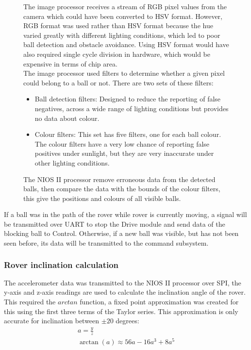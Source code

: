 \documentclass[11pt, a4paper]{article}
\begin{document}
\begin{figure}[ht]
\begin{minipage}[t]{0.5\linewidth}
        The image processor receives a stream of RGB pixel values from the camera which could have been converted to HSV format. However, RGB format was used rather than HSV format because the hue varied greatly with different lighting conditions, which led to poor ball detection and obstacle avoidance. Using HSV format would have also required single cycle division in hardware, which would be expensive in terms of chip area.
        \\
        The image processor used filters to determine whether a given pixel could belong to a ball or not. There are two sets of these filters:
        \begin{itemize}
            \item Ball detection filters: Designed to reduce the reporting of false negatives, across a wide range of lighting conditions but provides no data about colour.
            \item Colour filters: This set has five filters, one for each ball colour. The colour filters have a very low chance of reporting false positives under sunlight, but they are very inaccurate under other lighting conditions.
        \end{itemize}
        
        The NIOS II processor remove erroneous data from the detected balls, then compare the data with the bounds of the colour filters, this give the positions and colours of all visible balls. 
    \end{minipage}
\end{figure}

If a ball was in the path of the rover while rover is currently moving, a signal will be transmitted over UART to stop the Drive module and send data of the blocking ball to Control. Otherwise, if a new ball was visible, but has not been seen before, its data will be transmitted to the command subsystem.

\subsubsection{Rover inclination calculation}

The accelerometer data was transmitted to the NIOS II processor over SPI, the y-axis and z-axis readings are used to calculate the inclination angle of the rover. This required the $arctan$ function, a fixed point approximation was created for this using the first three terms of the Taylor series. This approximation is only accurate for inclination between $\pm 20$ degrees:
\begin{gather*}
    a = \frac{y}{z} \\
    \arctan(a) \approx 56a - 16a^3 + 8a^5
\end{gather*}
\end{document}
